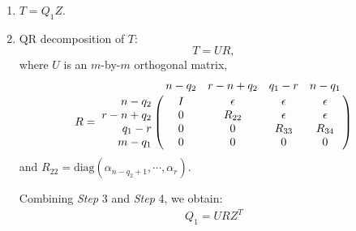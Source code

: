\begin{enumerate}
\begin{enumerate}
                
\item $T = Q_1Z$.
\item QR decomposition of $T$:
\begin{equation}
T = UR,
\end{equation}
where $U$ is an $m$-by-$m$ orthogonal matrix,
\begin{equation} \label{eq-R-block-case1}
R = \bordermatrix{ & n-q_2 & r-n+q_2 & q_1-r & n-q_1 \cr
\hfill n-q_2 & I & \epsilon & \epsilon & \epsilon \cr
\hfill r-n+q_2 & 0 & R_{22} & \epsilon & \epsilon \cr
\hfill q_1-r & 0 & 0 & R_{33} & R_{34} \cr
\hfill m-q_1 & 0 & 0 & 0 & 0}
\end{equation}
and $R_{22} = \mbox{diag}(\alpha_{n-q_2+1}, \cdots, \alpha_{r})$.
                    
                    
                    Combining \textit{Step} 3 and \textit{Step} 4, we obtain:
                    \begin{align} \label{eq-q_1-case1}
                        Q_1 = URZ^{T}
                    \end{align}
                    

\end{enumerate}
\end{enumerate}
